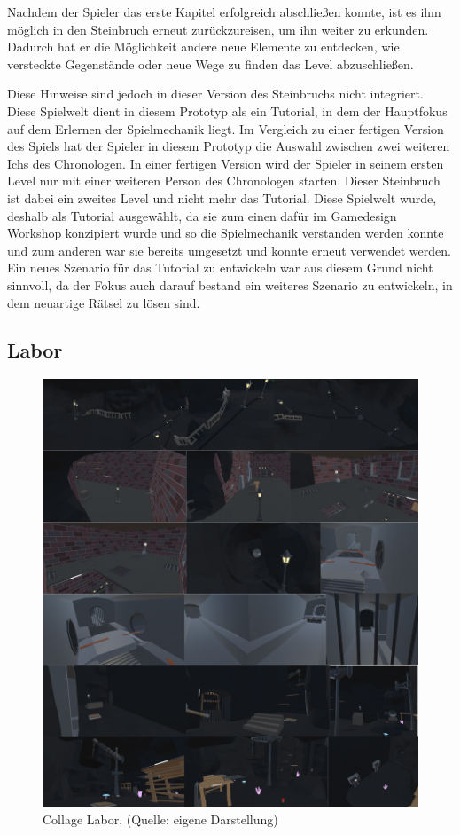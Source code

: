 Nachdem der Spieler das erste Kapitel erfolgreich abschließen konnte, ist es ihm möglich in den Steinbruch erneut zurückzureisen, um ihn weiter zu erkunden. Dadurch hat er die Möglichkeit andere neue Elemente zu entdecken, wie  versteckte Gegenstände oder neue Wege zu finden das Level abzuschließen.

Diese Hinweise sind jedoch in dieser Version des Steinbruchs nicht integriert. Diese Spielwelt dient in diesem Prototyp als ein Tutorial, in dem der Hauptfokus auf dem Erlernen der Spielmechanik liegt. Im Vergleich zu einer fertigen Version des Spiels hat der Spieler in diesem Prototyp die Auswahl zwischen zwei weiteren Ichs des Chronologen. In einer fertigen Version wird der Spieler in seinem ersten Level nur mit einer weiteren Person des Chronologen starten. Dieser Steinbruch ist dabei ein zweites Level und nicht mehr das Tutorial. Diese Spielwelt wurde, deshalb als Tutorial ausgewählt, da sie zum einen dafür im Gamedesign Workshop konzipiert wurde und so die Spielmechanik verstanden werden konnte und zum anderen war sie bereits umgesetzt und konnte erneut verwendet werden. Ein neues Szenario für das Tutorial zu entwickeln war aus diesem Grund nicht sinnvoll, da der Fokus auch darauf bestand ein weiteres Szenario zu entwickeln, in dem neuartige Rätsel zu lösen sind.

\subsection{Labor}

\begin{figure}[ht]
\centering
\includegraphics[width=1\linewidth]{content/pictures/Labor - A Fraction of Time.jpg}
\caption{Collage Labor, (Quelle: eigene Darstellung)}
\label{fig:collage_labor}
\end{figure}

